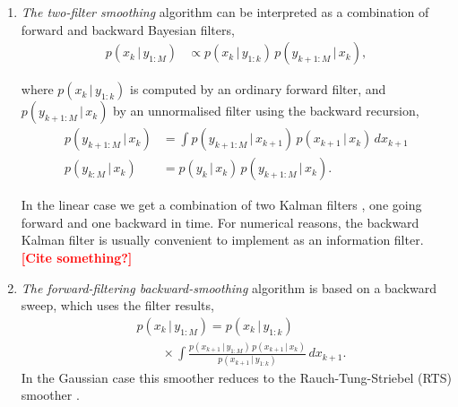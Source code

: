 \documentclass[twocolumn]{autart}    %
\newcommand{\comment}[1]{\textcolor{red}{\textbf{[#1]}}}
\begin{document}
\begin{enumerate}
\item {\em The two-filter smoothing} algorithm \cite{Lee:1964,Kitagawa:1994} can be interpreted as a combination of forward and backward Bayesian filters,
%
\begin{equation}
\begin{split}
  p(x_k \,|\, y_{1:M})
  &\propto
  p(x_k \,|\, y_{1:k}) \, p(y_{k+1:M} \,|\, x_k),
\end{split}
\end{equation}

where $p(x_k \,|\, y_{1:k})$ is computed by an ordinary forward filter, and $p(y_{k+1:M} \,|\, x_k)$ by an unnormalised filter using the backward recursion,
%
\begin{equation}
\begin{split}
  p(y_{k+1:M} \,|\, x_k)
  &= \int p(y_{k+1:M} \,|\, x_{k+1}) \, p(x_{k+1} \,|\, x_k) \,
          dx_{k+1} \\
  p(y_{k:M} \,|\, x_k)
  &= p(y_k \,|\, x_k) \, p(y_{k+1:M} \,|\, x_k).
\end{split}
\label{eq:tfsmooth}
\end{equation}

In the linear case we get a combination of two Kalman filters \cite{Fraser+Potter:1969}, one going forward and one backward in time. For numerical reasons, the backward Kalman filter is usually convenient to implement as an information filter. \comment{Cite something?}

\item {\em The forward-filtering backward-smoothing} algorithm   \cite{Kitagawa:1987} is based on a backward sweep, which uses the filter results,
%
\begin{equation}
\begin{split}
 &p(x_{k} \,|\, y_{1:M})
  = p(x_{k}\,|\,y_{1:k}) \\
 &\qquad \times \int
    \frac{p(x_{k+1} \,|\, y_{1:M}) \, p(x_{k+1}\,|\,x_{k})}
         {p(x_{k+1}\,|\,y_{1:k})} \, dx_{k+1}.
\end{split}
\label{eq:fbsmooth}
\end{equation}
%
In the Gaussian case this smoother reduces to the Rauch-Tung-Striebel (RTS) smoother \cite{Rauch+Tung+Striebel:1965}.
\end{enumerate}
\end{document}
